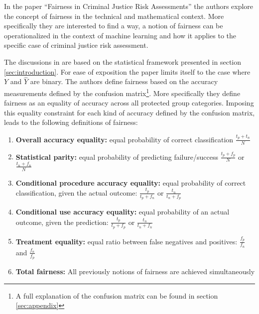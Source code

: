 In the paper \enquote{Fairness in Criminal Justice Risk Assessments} \cite{Berk.2018} 
the authors explore the concept of fairness in the technical and mathematical context. 
More specifically they are interested to find a way, a notion of fairness can be 
operationalized in the context of machine learning and how it applies to the specific
case of criminal justice risk assessment. 


The discussions in \cite{Berk.2018} are based on the statistical framework presented in section 
\ref{sec:introduction}. For ease of exposition the paper limits itself to the case where $Y$ and 
$\hat{Y}$ are binary. The authors define fairness based on the accuracy measurements defined 
by the confusion matrix\footnote{A full explanation of the confusion matrix can be found in 
section \ref{sec:appendix}}. More specifically they define fairness as an equality of accuracy 
across all protected group categories. Imposing this equality constraint for each kind of accuracy
defined by the confusion matrix, leads to the following definitions of fairness: 

\begin{enumerate}
    \item \textbf{Overall accuracy equality:} equal probability of correct classification 
    $\frac{t_p + t_n}{N}$ 
    \item \textbf{Statistical parity:} equal probability of predicting failure/success 
    $\frac{t_p + f_p}{N}$ or $\frac{t_n + f_n}{N}$
    \item \textbf{Conditional procedure accuracy equality:} equal probability of correct classification, given 
    the actual outcome: $\frac{t_p}{t_p + f_n}$ or $\frac{t_n}{t_n + f_p}$
    \item \textbf{Conditional use accuracy equality:} equal probability of an actual outcome, given the 
    prediction: $\frac{t_p}{t_p + f_p}$ or $\frac{t_n}{t_n + f_n}$
    \item \textbf{Treatment equality:} equal ratio between false negatives and positives: $\frac{f_p}{f_n}$ and 
    $\frac{f_n}{f_p}$
    \item \textbf{Total fairness:} All previously notions of fairness are achieved simultaneously
\end{enumerate}

